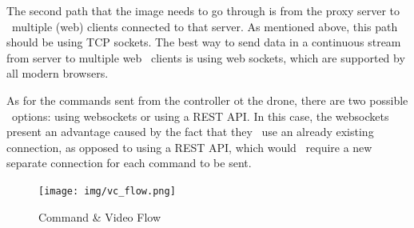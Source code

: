 The second path that the image needs to go through is from the proxy server to \
multiple (web) clients connected to that server.
As mentioned above, this path should be using TCP sockets.
The best way to send data in a continuous stream from server to multiple web \
clients is using web sockets, which are supported by all modern browsers.

As for the commands sent from the controller ot the drone, there are two possible \
options: using websockets or using a REST API.
In this case, the websockets present an advantage caused by the fact that they \
use an already existing connection, as opposed to using a REST API, which would \
require a new separate connection for each command to be sent.

\begin{figure}[ht]
    \label{fig:vc-flow}
    \texttt{[image: img/vc\_flow.png]}
    \caption{Command \& Video Flow}
\end{figure}
